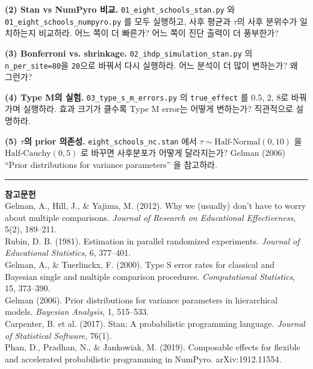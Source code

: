 \documentclass[11pt,a4paper]{article}
\begin{document}
\begin{exercise}
\textbf{(2) Stan vs NumPyro 비교.}
\texttt{01\_eight\_schools\_stan.py} 와 \texttt{01\_eight\_schools\_numpyro.py} 를 모두 실행하고, 사후 평균과 $\tau$의 사후 분위수가 일치하는지 비교하라.
어느 쪽이 더 빠른가? 어느 쪽이 진단 출력이 더 풍부한가?
\end{exercise}

\begin{exercise}
\textbf{(3) Bonferroni vs. shrinkage.}
\texttt{02\_ihdp\_simulation\_stan.py} 의 \texttt{n\_per\_site=80}을 \texttt{20}으로 바꿔서 다시 실행하라.
어느 분석이 더 많이 변하는가? 왜 그런가?
\end{exercise}

\begin{exercise}
\textbf{(4) Type M의 실험.}
\texttt{03\_type\_s\_m\_errors.py} 의 \texttt{true\_effect} 를 0.5, 2, 8로 바꿔가며 실행하라.
효과 크기가 클수록 Type M error는 어떻게 변하는가? 직관적으로 설명하라.
\end{exercise}

\begin{exercise}
\textbf{(5) $\tau$의 prior 의존성.}
\texttt{eight\_schools\_nc.stan} 에서 $\tau \sim \text{Half-Normal}(0,10)$ 을 $\text{Half-Cauchy}(0,5)$ 로 바꾸면 사후분포가 어떻게 달라지는가?
Gelman (2006) ``Prior distributions for variance parameters'' 을 참고하라.
\end{exercise}

\vspace{1em}
\hrule
\vspace{0.5em}
\small
\textbf{참고문헌}\\
Gelman, A., Hill, J., \& Yajima, M. (2012). Why we (usually) don't have to worry about multiple comparisons. \emph{Journal of Research on Educational Effectiveness}, 5(2), 189--211.\\
Rubin, D. B. (1981). Estimation in parallel randomized experiments. \emph{Journal of Educational Statistics}, 6, 377--401.\\
Gelman, A., \& Tuerlinckx, F. (2000). Type S error rates for classical and Bayesian single and multiple comparison procedures. \emph{Computational Statistics}, 15, 373--390.\\
Gelman (2006). Prior distributions for variance parameters in hierarchical models. \emph{Bayesian Analysis}, 1, 515--533.\\
Carpenter, B. et al. (2017). Stan: A probabilistic programming language. \emph{Journal of Statistical Software}, 76(1).\\
Phan, D., Pradhan, N., \& Jankowiak, M. (2019). Composable effects for flexible and accelerated probabilistic programming in NumPyro. arXiv:1912.11554.
\end{document}
